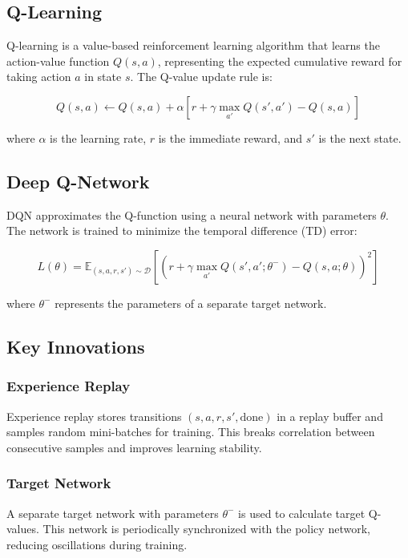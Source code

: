 \documentclass[12pt,a4paper]{article}
\begin{document}
\subsection{Q-Learning}
Q-learning is a value-based reinforcement learning algorithm that learns the action-value function $Q(s, a)$, representing the expected cumulative reward for taking action $a$ in state $s$. The Q-value update rule is:

\begin{equation}
Q(s, a) \leftarrow Q(s, a) + \alpha [r + \gamma \max_{a'} Q(s', a') - Q(s, a)]
\end{equation}

where $\alpha$ is the learning rate, $r$ is the immediate reward, and $s'$ is the next state.

\subsection{Deep Q-Network}
DQN approximates the Q-function using a neural network with parameters $\theta$. The network is trained to minimize the temporal difference (TD) error:

\begin{equation}
L(\theta) = \mathbb{E}_{(s,a,r,s') \sim \mathcal{D}} \left[ \left( r + \gamma \max_{a'} Q(s', a'; \theta^-) - Q(s, a; \theta) \right)^2 \right]
\end{equation}

where $\theta^-$ represents the parameters of a separate target network.

\subsection{Key Innovations}

\subsubsection{Experience Replay}
Experience replay stores transitions $(s, a, r, s', \text{done})$ in a replay buffer and samples random mini-batches for training. This breaks correlation between consecutive samples and improves learning stability.

\subsubsection{Target Network}
A separate target network with parameters $\theta^-$ is used to calculate target Q-values. This network is periodically synchronized with the policy network, reducing oscillations during training.
\end{document}
